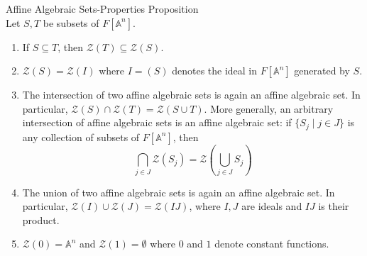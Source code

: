 \begin{proposition}{Affine Algebraic Sets-Properties Proposition}\\
Let $S,T$ be subsets of $F[\mathbb{A}^n]$.
\begin{enumerate}
    \item If $S\subseteq T$, then $\mathcal{Z} (T) \subseteq \mathcal{Z}(S)$.
    \item $\mathcal{Z}(S) =\mathcal{Z}(I)$ where $I=(S)$ denotes the ideal in $F[\mathbb{A}^n]$ generated by $S$.

    \item The intersection of two affine algebraic sets is again an affine algebraic set. In particular, $\mathcal{Z}(S) \cap \mathcal{Z} (T) =\mathcal{Z} (S\cup T)$. More generally, an arbitrary intersection of affine algebraic sets is an affine algebraic set: if $\{S_j\mid j\in J\}$ is any collection of subsets of $F[\mathbb{A}^n]$, then
    $$\bigcap_{j \in J} \mathcal{Z}(S_j) = \mathcal{Z} (\bigcup_{j \in J} S_j)$$

    \item The union of two affine algebraic sets is again an affine algebraic set. In particular, $\mathcal{Z} (I) \cup \mathcal{Z}(J) =\mathcal{Z}(IJ)$, where $I,J$ are ideals and $IJ$ is their product.

    \item $\mathcal{Z} (0) =\mathbb{A}^n$ and $\mathcal{Z}(1) =\emptyset$ where $0$ and $1$ denote constant functions.
\end{enumerate}
\end{proposition}

